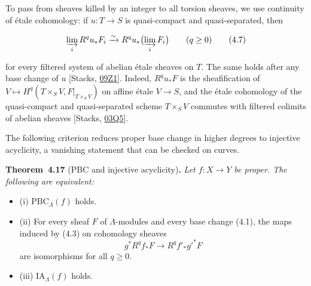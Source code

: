 \documentclass[11pt]{article}
\newenvironment{bpstatement}[2]{\par\addvspace{0.6\baselineskip}\noindent\textbf{#1}#2\textbf{.}\enspace\ignorespaces}
  {\par\addvspace{0.4\baselineskip}}
\newenvironment{bpstatementit}[2]{\begin{bpstatement}{#1}{#2}\itshape\ignorespaces}{\end{bpstatement}}
\begin{document}
\label{bp44}%
To pass from sheaves killed by an integer to all torsion sheaves, we use continuity of étale cohomology: if \(u:T\to S\) is quasi-compact and quasi-separated, then

\[
\varinjlim_i R^qu_*F_i\xrightarrow{\sim}
R^qu_*\bigl(\varinjlim_i F_i\bigr)\qquad(q\geq0)
\tag{4.7}
\]

for every filtered system of abelian étale sheaves on \(T\). The same holds after any base change of \(u\) [Stacks, \href{https://stacks.math.columbia.edu/tag/09Z1}{09Z1}]. Indeed, \(R^qu_*F\) is the sheafification of \(V\mapsto H^q(T\times_SV,F|_{T\times_SV})\) on affine étale \(V\to S\), and the étale cohomology of the quasi-compact and quasi-separated scheme \(T\times_SV\) commutes with filtered colimits of abelian sheaves [Stacks, \href{https://stacks.math.columbia.edu/tag/03Q5}{03Q5}].

The following criterion reduces proper base change in higher degrees to injective acyclicity, a vanishing statement that can be checked on curves.

\label{bp45}%
\begin{bpstatementit}{Theorem~4.17}{ (PBC and injective acyclicity)}
Let \(f:X\to Y\) be proper. The following are equivalent:

\begin{itemize}
\item (i) \(\mathrm{PBC}_\Lambda(f)\) holds.
\item (ii) For every sheaf \(F\) of \(\Lambda\)-modules and every base change (4.1), the maps induced by (4.3) on cohomology sheaves \[
  g^*R^qf_*F\longrightarrow R^qf'_*g'^*F
  \] are isomorphisms for all \(q\geq0\).
\item (iii) \(\mathrm{IA}_\Lambda(f)\) holds.
\end{itemize}
\end{bpstatementit}
\end{document}
